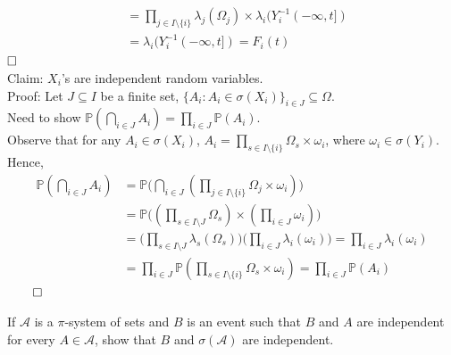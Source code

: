 \begin{answer}
\begin{equation*}
\begin{aligned}
            \\&= \prod_{j \in I \setminus \{ i\}} \lambda_j(\Omega_j) \times \lambda_i(Y_{i}^{-1} ( -\infty, t ])
            \\&= \lambda_i(Y_{i}^{-1} ( -\infty, t ]) = F_i(t)
        \end{aligned}
    \end{equation*}
    $\hfill\Box$
    \\Claim: $X_i$'s are independent random variables.
    \\Proof: Let $J \subseteq I$ be a finite set, $\{ A_i : A_{i} \in \sigma(X_i)\}_{i \in J} \subseteq \Omega$. 
    \\Need to show $\mathbb{P}(\bigcap_{i \in J }A_{i} ) = \prod_{i \in J} \mathbb{P}(A_i)$.
    \\Observe that for any $A_i \in \sigma(X_i)$, $A_i = \prod_{s \in I \setminus \{ i\}} \Omega_s \times \omega_i$, where $\omega_i \in \sigma (Y_i)$.
    \\Hence, 
    \begin{equation*}
        \begin{aligned}
                    \mathbb{P}(\bigcap_{i \in J }A_{i}) &= \mathbb{P}\Big( \bigcap_{i \in J }(\prod_{j \in I \setminus \{ i\}} \Omega_j \times \omega_i)\Big)
                    \\&= \mathbb{P}\Big( (\prod_{s \in I \setminus J}\Omega_s) \times (\prod_{i \in J} \omega_i) \Big)
                    \\&= \Big(\prod_{s \in I \setminus J} \lambda_s(\Omega_s) \Big)\Big( \prod_{i \in J} \lambda_i(\omega_i)\Big) = \prod_{i \in J} \lambda_i(\omega_i)
                    \\&= \prod_{i \in J} \mathbb{P}(\prod_{s \in I \setminus \{ i\}}\Omega_s \times \omega_i) = \prod_{i \in J} \mathbb{P}(A_i)
        \end{aligned}
    \end{equation*}
    $\hfill\qed$ 
\end{answer}

\label{7.1.9}
If $\mathcal{A}$ is a $\pi$-system of sets and $B$ is an event such that $B$ and $A$ are independent for every $A\in\mathcal{A}$, show that $B$ and $\sigma(\mathcal{A})$ are independent.\\

